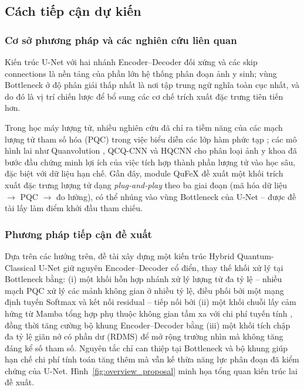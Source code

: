 \documentclass[14pt]{article}  %
\begin{document}
{    \subsection{Cách tiếp cận dự kiến}

\subsubsection{Cơ sở phương pháp và các nghiên cứu liên quan}

Kiến trúc U-Net \cite{ronneberger2015unet} với hai nhánh Encoder--Decoder đối xứng và các skip connections là nền tảng của phần lớn hệ thống phân đoạn ảnh y sinh; vùng Bottleneck ở độ phân giải thấp nhất là nơi tập trung ngữ nghĩa toàn cục nhất, và do đó là vị trí chiến lược để bổ sung các cơ chế trích xuất đặc trưng tiên tiến hơn.

Trong học máy lượng tử, nhiều nghiên cứu đã chỉ ra tiềm năng của các mạch lượng tử tham số hóa (PQC) trong việc biểu diễn các lớp hàm phức tạp \cite{biamonte2017qml}; các mô hình lai như Quanvolution \cite{henderson2020quanvolution}, QCQ-CNN \cite{long2025qcq} và HQCNN cho phân loại ảnh y khoa \cite{shahjalal2025hqcnn} đã bước đầu chứng minh lợi ích của việc tích hợp thành phần lượng tử vào học sâu, đặc biệt với dữ liệu hạn chế. Gần đây, module QuFeX \cite{qufex2025} đề xuất một khối trích xuất đặc trưng lượng tử dạng \textit{plug-and-play} theo ba giai đoạn (mã hóa dữ liệu $\to$ PQC $\to$ đo lường), có thể nhúng vào vùng Bottleneck của U-Net -- được đề tài lấy làm điểm khởi đầu tham chiếu.

\subsubsection{Phương pháp tiếp cận đề xuất}

Dựa trên các hướng trên, đề tài xây dựng một kiến trúc Hybrid Quantum-Classical U-Net giữ nguyên Encoder--Decoder cổ điển, thay thế khối xử lý tại Bottleneck bằng: (i) một khối hỗn hợp nhánh xử lý lượng tử đa tỷ lệ -- nhiều mạch PQC xử lý các mảnh không gian ở nhiều tỷ lệ, điều phối bởi một mạng định tuyến Softmax và kết nối residual -- tiếp nối bởi (ii) một khối chuỗi lấy cảm hứng từ Mamba tổng hợp phụ thuộc không gian tầm xa với chi phí tuyến tính \cite{gu2023mamba}, đồng thời tăng cường bộ khung Encoder--Decoder bằng (iii) một khối tích chập đa tỷ lệ giãn nở có phần dư (RDMS) để mở rộng trường nhìn mà không tăng đáng kể số tham số. Nguyên tắc chỉ can thiệp tại Bottleneck và bộ khung giúp hạn chế chi phí tính toán tăng thêm mà vẫn kế thừa năng lực phân đoạn đã kiểm chứng của U-Net. Hình~\ref{fig:overview_proposal} minh họa tổng quan kiến trúc lai đề xuất.

}
\end{document}
